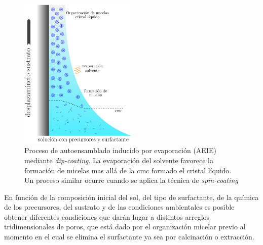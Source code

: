  			\begin{figure}[th!]
 				\begin{center}
 				\includegraphics[width=0.5\textwidth]{Esquemas/autoensam.pdf}
 				\caption[Proceso de autoensamblado inducido por evaporación (AEIE)]{Proceso de autoensamblado inducido por evaporación (AEIE) mediante \textit{dip-coating}. La evaporación del solvente favorece la formación de micelas mas allá de la cmc formado el cristal líquido. Un proceso similar ocurre cuando se aplica la técnica de \textit{spin-coating}}
 		   		\label{fig:autoensam}
 		    	\end{center}
 		    	\end{figure}
	
   	En función de la composición inicial del sol, del tipo de surfactante, de la química de los precursores, del sustrato y de las condiciones ambientales es posible obtener diferentes condiciones que darán lugar a distintos arreglos tridimensionales de poros, que está dado por el organización micelar previo al momento en el cual se elimina el surfactante ya sea por calcinación o extracción.\cite{Grosso2004,Grosso2002,Crepaldi2002a,Grosso2003,Violi2015} 
	



	 	
